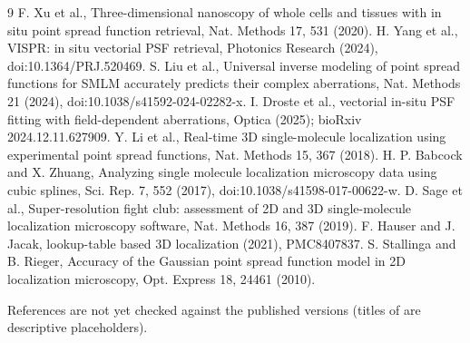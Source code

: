\documentclass[11pt,a4paper]{article}
\begin{document}
\limittext

\begin{thebibliography}{9}\small
{} F. Xu et al., Three-dimensional nanoscopy of whole cells and tissues with in situ point spread
function retrieval, Nat. Methods 17, 531 (2020).
 H. Yang et al., VISPR: in situ vectorial PSF retrieval, Photonics Research (2024),
doi:10.1364/PRJ.520469.
 S. Liu et al., Universal inverse modeling of point spread functions for SMLM accurately predicts
their complex aberrations, Nat. Methods 21 (2024), doi:10.1038/s41592-024-02282-x.
 I. Droste et al., vectorial in-situ PSF fitting with field-dependent aberrations, Optica (2025);
bioRxiv 2024.12.11.627909.
 Y. Li et al., Real-time 3D single-molecule localization using experimental point spread
functions, Nat. Methods 15, 367 (2018).
 H. P. Babcock and X. Zhuang, Analyzing single molecule localization microscopy data using
cubic splines, Sci. Rep. 7, 552 (2017), doi:10.1038/s41598-017-00622-w.
 D. Sage et al., Super-resolution fight club: assessment of 2D and 3D single-molecule
localization microscopy software, Nat. Methods 16, 387 (2019).
 F. Hauser and J. Jacak, lookup-table based 3D localization (2021), PMC8407837.
 S. Stallinga and B. Rieger, Accuracy of the Gaussian point spread function model in 2D
localization microscopy, Opt. Express 18, 24461 (2010).
\end{thebibliography}
References are not yet checked against the published versions (titles of \cite{vispr,droste,hauser} are
descriptive placeholders).
\end{document}
